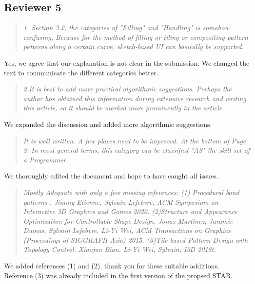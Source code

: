 \documentclass{egpubl}
\newcommand{\rev}[2]{{\color{greenrev}\textsuperscript{#1}#2}}
\renewcommand{\rev}[2]{{#2}}
\begin{document}
\subsection*{Reviewer 5} 

\begin{quote}
\emph{1. Section 3.2, the categories of "Filling" and "Handling" is somehow confusing, Because for the method of filling or tiling or compositing pattern patterns along a certain curve, sketch-based UI can basically be supported.}
\end{quote}

\rev{Comment}{Yes, we agree that our explanation is not clear in the submission. We changed the text to communicate the different categories better.}

\begin{quote}
\emph{2.It is best to add more practical algorithmic suggestions. Perhaps the author has obtained this information during extensive research and writing this article, so it should be marked more prominently in the article.}
\end{quote}

\rev{}{We expanded the discussion and added more algorithmic suggestions.}

\begin{quote}
\emph{It is well written.  A few places need to be improved.
At the bottom of Page 3:  In most general terms, this category can be classified  "AS" the skill set of a Programmer.}
\end{quote}

\rev{}{We thoroughly edited the document and hope to have caught all issues.}


\begin{quote}
\emph{Mostly Adequate with only a few missing references: (1) Procedural band patterns . Jimmy Etienne, Sylvain Lefebvre, ACM Symposium on Interactive 3D Graphics and Games 2020. (2)Structure and Appearance Optimization for Controllable Shape Design. Jonas Martinez, Jaramie Dumas, Sylvain Lefebvre, Li-Yi Wei, ACM Transactions on Graphics (Proceedings of SIGGRAPH Asia) 2015. (3)Tile-based Pattern Design with Topology Control. Xiaojun Bian, Li-Yi Wei, Sylvain, I3D 2018t.}
\end{quote}


\rev{}{
    We added references (1) and (2), thank you for these suitable additions. Reference (3) was already included in the first version of the propsed STAR.
}



%  
%        




\end{document}
